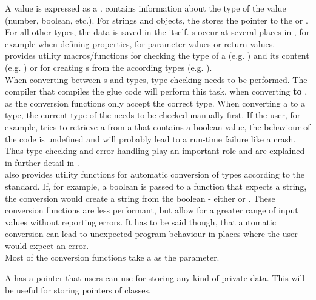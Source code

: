 A  value is expressed as a .  contains information about the type of the value (number, boolean, etc.). For strings and objects, the  stores the pointer to the  or . For all other types, the data is saved in the  itself. s occur at several places in , for example when defining properties, for parameter values or return values.\\
 provides utility macros/functions for checking the type of a  \linebreak(e.g. ) and its content (e.g. ) or for creating s from the according   types (e.g. ).\\
When converting between s and  types, type checking needs to be performed. The  compiler that compiles the glue code will perform this task, when converting \textbf{to} , as the conversion functions only accept the correct type. When converting a  to a  type, the current type of the  needs to be checked manually first. If the  user, for example, tries to retrieve a  from a  that contains a boolean value, the behaviour of the code is undefined and will probably lead to a run-time failure like a crash. Thus type checking and error handling play an important role and are explained in further detail in .\\
 also provides utility functions for automatic conversion of types according to the  standard. If, for example, a boolean is passed to a function that expects a string, the conversion would create a string from the boolean - either  or . These conversion functions are less performant, but allow for a greater range of input values without reporting errors. It has to be said though, that automatic conversion can lead to unexpected program behaviour in places where the user would expect an error.\\
Most of the conversion functions take a  as the parameter.

A  has a  pointer that  users can use for storing any kind of private data. This will be useful for storing pointers of  classes.

